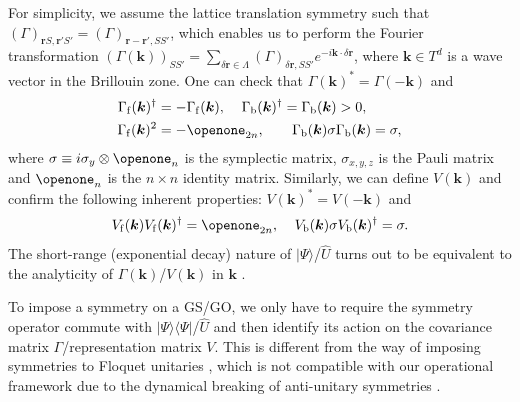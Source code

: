 \documentclass[prl,twocolumn,preprintnumbers,superscriptaddress,amsmath,amssymb]{revtex4-1}
\begin{document}
For simplicity, we assume the lattice translation symmetry such that $(\Gamma)_{\boldsymbol{r}S,\boldsymbol{r}'S'}=(\Gamma)_{\boldsymbol{r}-\boldsymbol{r}',SS'}$, which enables us to perform the Fourier transformation $(\Gamma (\boldsymbol{k}))_{SS'}= \sum_{\delta\boldsymbol{r}\in\Lambda} (\Gamma)_{\delta\boldsymbol{r},SS'} e^{-i\boldsymbol{k}\cdot\delta\boldsymbol{r}}$, where $\boldsymbol{k}\in T^d$ is a wave vector in the Brillouin zone. One can check that $\Gamma (\boldsymbol{k})^*= \Gamma (-\boldsymbol{k})$ and
\begin{align}
\Gamma_{\rm f}(\boldsymbol{k})^\dag &=-\Gamma_{\rm f}(\boldsymbol{k}),\;\;\;\;
\Gamma_{\rm b}(\boldsymbol{k})^\dag =\Gamma_{\rm b}(\boldsymbol{k})>0,\\
\Gamma_{\rm f}(\boldsymbol{k})^2&=-\openone_{2n},\;\;\;\;\;\;\;
\Gamma_{\rm b}(\boldsymbol{k})\sigma\Gamma_{\rm b}(\boldsymbol{k})=\sigma,
\label{flat}
\end{align}
where $\sigma\equiv i\sigma_y\otimes\openone_n$ is the symplectic matrix, $\sigma_{x,y,z}$ is the Pauli matrix and $\openone_n$ is the $n\times n$ identity matrix. Similarly, we can define $V(\boldsymbol{k})$ and confirm the following inherent properties: $V (\boldsymbol{k})^*=V (-\boldsymbol{k})$ and 
\begin{equation}
V_{\rm f}(\boldsymbol{k})V_{\rm f}(\boldsymbol{k})^\dag=\openone_{2n},\;\;\;\;
V_{\rm b}(\boldsymbol{k})\sigma V_{\rm b}(\boldsymbol{k})^\dag=\sigma.
\label{unisym}
\end{equation}
The short-range (exponential decay) nature of $|\Psi \rangle$/$\hat U $ turns out to be equivalent to the analyticity of $\Gamma (\boldsymbol{k})$/$V (\boldsymbol{k})$ in $\boldsymbol{k}$ \cite{Ashida2021}.

To impose a symmetry on a GS/GO, we only have to require the symmetry operator commute \cite{UUd} with $|\Psi \rangle\langle\Psi |$/$\hat U $ and then identify its action on the covariance matrix $\Gamma $/representation matrix $V $. This is different from the way of imposing symmetries to Floquet unitaries \cite{Nakagawa2019}, which is not compatible with our operational framework due to the dynamical breaking of anti-unitary symmetries \cite{McGinley2018}.
\end{document}
